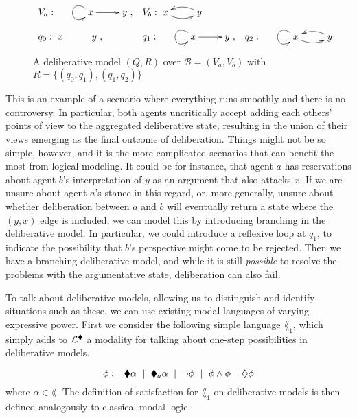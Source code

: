\documentclass{article}
\newcommand{\views}{\mathcal B}
\begin{document}
\begin{figure}\label{fig:del1}
$\begin{array}{llllll}
V_a: \xymatrix{& x \ar[r] \ar@(lu,ld) & y}, & V_b: \xymatrix{x \ar@/_/[r] & y \ar@/_/[l] } \\ \\
q_0: \xymatrix{ x & y }, & q_1: \xymatrix{& x \ar@(lu,ld)  \ar[r] & y }, & q_2: \xymatrix{&  x \ar@(lu,ld)  \ar@/_/[r] & y \ar@/_/[l]}
\end{array}$
\caption{A deliberative model $(Q,R)$ over $\views = (V_a,V_b)$ with $R = \{(q_0,q_1),(q_1,q_2)\}$}
\end{figure}

This is an example of a scenario where everything runs smoothly and there is no controversy. In particular, both agents uncritically accept adding each others' points of view to the aggregated deliberative state, resulting in the union of their views emerging as the final outcome of deliberation. Things might not be so simple, however, and it is the more complicated scenarios that can benefit the most from logical modeling. It could be for instance, that agent $a$ has reservations about agent $b$'s interpretation of $y$ as an argument that also attacks $x$. If we are unsure about agent $a$'s stance in this regard, or, more generally, unsure about whether deliberation between $a$ and $b$ will eventually return a state where the $(y,x)$ edge is included, we can model this by introducing branching in the deliberative model. In particular, we could introduce a reflexive loop at $q_1$, to indicate the possibility that $b$'s perspective might come to be rejected. Then we have a branching deliberative model, and while it is still \emph{possible} to resolve the problems with the argumentative state, deliberation can also fail. 

To talk about deliberative models, allowing us to distinguish and identify situations such as these, we can use existing modal languages of varying expressive power. First we consider the following simple language $\lang_1$, which simply adds to $\mathcal L^{\blacklozenge}$ a modality for talking about one-step possibilities in deliberative models.

$$
\phi := \blacklozenge \alpha \ \mid \ \blacklozenge_a \alpha \ \mid \ \neg \phi \ \mid \ \phi \land \phi \ \mid \lozenge \phi
$$
where $\alpha \in \lang$. The definition of satisfaction for $\lang_1$ on deliberative models is then defined analogously to classical modal logic.
\end{document}
